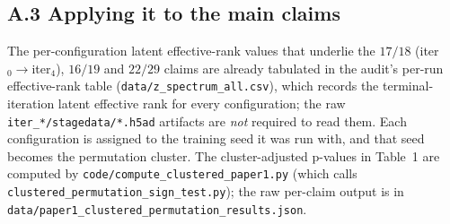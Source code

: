 \documentclass[11 pt,a4 paper]{article}
\begin{document}
\subsection*{A.3 Applying it to the main claims}
The per-configuration latent effective-rank values that underlie the $17/18$
(iter$_0\!\to\!$iter$_4$), $16/19$ and $22/29$ claims are already tabulated in
the audit's per-run effective-rank table
(\texttt{data/z\_spectrum\_all.csv}), which records the
terminal-iteration latent effective rank for every configuration; the raw
\texttt{iter\_*/stagedata/*.h5ad} artifacts are \emph{not} required to read
them. Each configuration is assigned to the training seed it was run with, and
that seed becomes the permutation cluster. The cluster-adjusted p-values in
Table~1 are computed by
\texttt{code/compute\_clustered\_paper1.py} (which calls
\texttt{clustered\_permutation\_sign\_test.py}); the raw per-claim output is in
\texttt{data/paper1\_clustered\_permutation\_results.json}.
\end{document}
